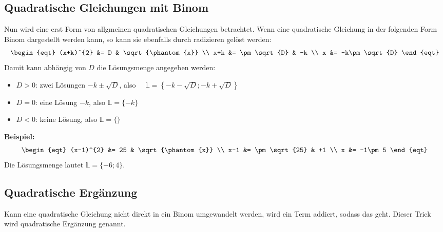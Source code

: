 \subsection{Quadratische Gleichungen mit Binom}

Nun wird eine erst Form von allgmeinen quadratischen Gleichungen betrachtet. Wenn eine quadratische Gleichung in der folgenden Form Binom dargestellt werden kann, so kann sie ebenfalls durch radizieren gelöst werden:
\[\begin{eqt}
  (x+k)^{2} &= D & \sqrt{\phantom{x}} \\
        x+k &= \pm\sqrt{D} & -k \\
          x &= -k\pm\sqrt{D}
\end{eqt}\]
Damit kann abhängig von $D$ die Lösungsmenge angegeben werden:
\begin{itemize}
  \item $D>0$: zwei Lösungen $-k\pm\sqrt{D}$, also $\quad\mathbb{L} = \left\{-k-\sqrt{D};-k+\sqrt{D}\right\}$
  \item $D=0$: eine Lösung $-k$, also $\mathbb{L} = \{-k\}$
  \item $D<0$: keine Lösung, also $\mathbb{L} = \{\}$
\end{itemize}

\begin{example}
  \textbf{Beispiel:}
  \[\begin{eqt}
    (x-1)^{2} &= 25 & \sqrt{\phantom{x}} \\
          x-1 &= \pm\sqrt{25} & +1 \\
            x &= -1\pm 5
  \end{eqt}\]
  Die Lösungsmenge lautet $\mathbb{L} = \{-6;4\}$.
\end{example}

\subsection{Quadratische Ergänzung}

Kann eine quadratische Gleichung nicht direkt in ein Binom umgewandelt werden, wird ein Term addiert, sodass das geht. Dieser Trick wird quadratische Ergänzung genannt.

